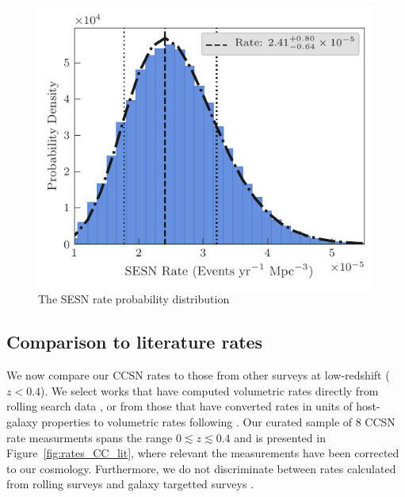 \documentclass[a4paper,fleqn,usenatbib]{mnras}
\begin{document}
\begin{figure}
	\includegraphics[width=\linewidth]{./SESN_Rate.pdf}
    \caption{The SESN rate probability distribution}
    \label{fig:SESNrateProbDist}
\end{figure}

\subsection{Comparison to literature rates}

We now compare our CCSN rates to those from other surveys at low-redshift ($z<0.4$). We select works that have computed volumetric rates directly from rolling search data \citep[e.g.][]{2009A&A...499..653B}, or from those that have converted rates in units of host-galaxy properties to volumetric rates following \citet{2008A&A...479...49B}. Our curated sample of 8 CCSN rate measurments spans the range $0\lesssim z \lesssim 0.4$ and is presented in Figure~\ref{fig:rates_CC_lit}, where relevant the measurements have been corrected to our cosmology. Furthermore, we do not discriminate between rates calculated from rolling surveys \citep[e.g.][]{2009A&A...499..653B} and galaxy targetted surveys \citep[e.g.][]{1999A&A...351..459C}.
\end{document}
